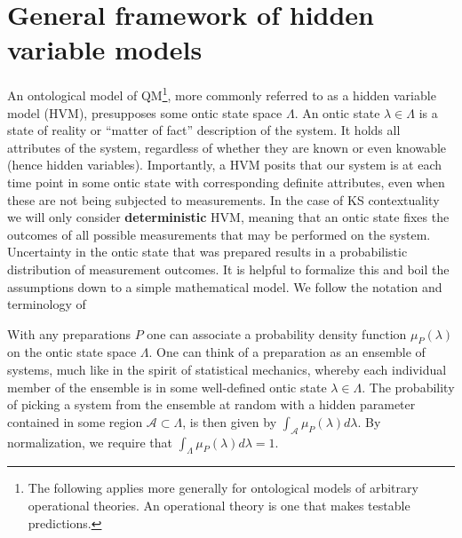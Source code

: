 \section{General framework of hidden variable models}
\label{sec:hvm}
An ontological model of QM\footnote{The following applies more generally for ontological models of arbitrary operational theories. An operational theory is one that makes testable predictions.}, more commonly referred to as a hidden variable model (HVM), presupposes some ontic state space $\Lambda$. An ontic state $\lambda\in\Lambda$ is a state of reality or “matter of fact” description of the system. It holds all attributes of the system, regardless of whether they are known or even knowable (hence hidden variables). Importantly, a HVM posits that our system is at each time point in some ontic state with corresponding definite attributes, even when these are not being subjected to measurements. In the case of KS contextuality we will only consider \textbf{deterministic} HVM, meaning that an ontic state fixes the outcomes of all possible measurements that may be performed on the system. Uncertainty in the ontic state that was prepared results in a probabilistic distribution of measurement outcomes. It is helpful to formalize this and boil the assumptions down to a simple mathematical model. We follow the notation and terminology of \cite{Spekkens2005} 

With any preparations $P$ one can associate a probability density function $\mu_{P}(\lambda)$ on the ontic state space $\Lambda$. One can think of a preparation as an ensemble of systems, much like in the spirit of statistical mechanics, whereby each individual member of the ensemble is in some well-defined ontic state $\lambda\in\Lambda$. The probability of picking a system from the ensemble at random with a hidden parameter contained in some region $\mathcal{A}\subset\Lambda$, is then given by $\int_{\mathcal{A}}\mu_{P}(\lambda)d\lambda$. By normalization, we require that $\int_{\Lambda}\mu_{P}(\lambda)d\lambda=1$.

